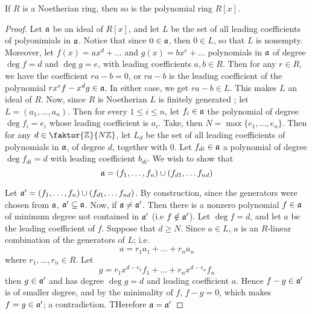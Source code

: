 \begin{theorem}\label{1.4.3}
    If $R$ is a Noetherian ring, then so is the polynomial ring $R[x]$.
\end{theorem}
\begin{proof}
    Let $\mathfrak{a}$ be an ideal of  $R[x]$, and let $L$ be the set of all leading
    coefficients of polyonimials in $\mathfrak{a}$. Notice that since  $0 \in \mathfrak{a}$, then  $0
    \in L$, so that $L$ is nonempty. Moreover, let $f(x)=ax^d+\dots$ and
    $g(x)=bx^e+\dots$ polynomials in $\mathfrak{a}$ of degree  $\deg{f}=d$ and $\deg{g}=e$,
    with leading coefficients $a, b \in R$. Then for any  $r \in R$, we have the
    coefficient  $ra-b=0$, or  $ra-b$ is the leading coefficient of the
    polynomial  $rx^ef-x^dg \in \mathfrak{a}$. In either case, we get  $ra-b \in L$. This
    makes  $L$ an ideal of  $R$. Now, since  $R$ is Noetherian  $L$ is finitely
    generated ; let $L=(a_1, \dots, a_n)$. Then for every $1 \leq  i \leq n$,
    let  $f_i \in \mathfrak{a}$ the polynomial of degree  $\deg{f_i}=e_i$ whose leading
    coefficient is $a_i$. Take, then  $N=\max{\{e_1, \dots, e_n\}}$. Then for
    any $d \in \faktor{\Z}{N\Z}$, let $L_d$ be the set of all leading
    coefficients of polynomials in  $\mathfrak{a}$, of degree $d$, together with $0$. Let
    $f_{di} \in \mathfrak{a}$ a polynomial of degree $\deg{f_{di}}=d$ with leading
    coefficient $b_{di}$. We wish to show that
    \begin{equation*}
        \mathfrak{a}=(f_1, \dots, f_n) \cup (f_{d1}, \dots f_{nd})
    \end{equation*}

    Let $\mathfrak{a}'=(f_1, \dots, f_n) \cup (f_{d1}, \dots f_{nd})$. By construction,
    since the generators were chosen from $\mathfrak{a}$,  $\mathfrak{a}' \subseteq \mathfrak{a}$. Now, if
    $\mathfrak{a} \neq \mathfrak{a}'$. Then there is a nonzero polynomial $f \in \mathfrak{a}$ of minimum degree
     not contained in $\mathfrak{a}'$  (i.e $f \notin \mathfrak{a}'$). Let $\deg{f}=d$, and let $a$ be
     the leading coefficient of  $f$. Suppose that  $d \geq N$. Since  $a \in
     L$, $a$ is an  $R$-linear combination of the generators of  $L$; i.e.
     \begin{equation*}
         a=r_1a_1+\dots+r_na_n
     \end{equation*}
     where $r_1, \dots, r_n \in R$. Let
     \begin{equation*}
        g=r_1x^{d-e_1}f_1+\dots+r_nx^{d-e_n}f_n
     \end{equation*}
     then $g \in \mathfrak{a}'$ and has degree $\deg{g}=d$ and leading coefficient $a$.
     Hence  $f-g \in \mathfrak{a}'$ is of smaller degree, and by the minimality of  $f$,
     $f-g=0$, which makes  $f=g \in \mathfrak{a}'$; a contradiction. THerefore $\mathfrak{a}=\mathfrak{a}'$


\end{proof}
